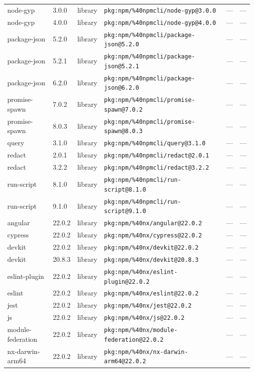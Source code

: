 \documentclass[11pt]{article}
\begin{document}
\begin{longtable}{|l|l|l|p{2.2cm}|l|p{4cm}|}
node-gyp & 3.0.0 & library & \texttt{pkg:npm/\%40npmcli/node-gyp@3.0.0} & — & — \\
node-gyp & 4.0.0 & library & \texttt{pkg:npm/\%40npmcli/node-gyp@4.0.0} & — & — \\
package-json & 5.2.0 & library & \texttt{pkg:npm/\%40npmcli/package-json@5.2.0} & — & — \\
package-json & 5.2.1 & library & \texttt{pkg:npm/\%40npmcli/package-json@5.2.1} & — & — \\
package-json & 6.2.0 & library & \texttt{pkg:npm/\%40npmcli/package-json@6.2.0} & — & — \\
promise-spawn & 7.0.2 & library & \texttt{pkg:npm/\%40npmcli/promise-spawn@7.0.2} & — & — \\
promise-spawn & 8.0.3 & library & \texttt{pkg:npm/\%40npmcli/promise-spawn@8.0.3} & — & — \\
query & 3.1.0 & library & \texttt{pkg:npm/\%40npmcli/query@3.1.0} & — & — \\
redact & 2.0.1 & library & \texttt{pkg:npm/\%40npmcli/redact@2.0.1} & — & — \\
redact & 3.2.2 & library & \texttt{pkg:npm/\%40npmcli/redact@3.2.2} & — & — \\
run-script & 8.1.0 & library & \texttt{pkg:npm/\%40npmcli/run-script@8.1.0} & — & — \\
run-script & 9.1.0 & library & \texttt{pkg:npm/\%40npmcli/run-script@9.1.0} & — & — \\
angular & 22.0.2 & library & \texttt{pkg:npm/\%40nx/angular@22.0.2} & — & — \\
cypress & 22.0.2 & library & \texttt{pkg:npm/\%40nx/cypress@22.0.2} & — & — \\
devkit & 22.0.2 & library & \texttt{pkg:npm/\%40nx/devkit@22.0.2} & — & — \\
devkit & 20.8.3 & library & \texttt{pkg:npm/\%40nx/devkit@20.8.3} & — & — \\
eslint-plugin & 22.0.2 & library & \texttt{pkg:npm/\%40nx/eslint-plugin@22.0.2} & — & — \\
eslint & 22.0.2 & library & \texttt{pkg:npm/\%40nx/eslint@22.0.2} & — & — \\
jest & 22.0.2 & library & \texttt{pkg:npm/\%40nx/jest@22.0.2} & — & — \\
js & 22.0.2 & library & \texttt{pkg:npm/\%40nx/js@22.0.2} & — & — \\
module-federation & 22.0.2 & library & \texttt{pkg:npm/\%40nx/module-federation@22.0.2} & — & — \\
nx-darwin-arm64 & 22.0.2 & library & \texttt{pkg:npm/\%40nx/nx-darwin-arm64@22.0.2} & — & — \\

\end{longtable}
\end{document}
